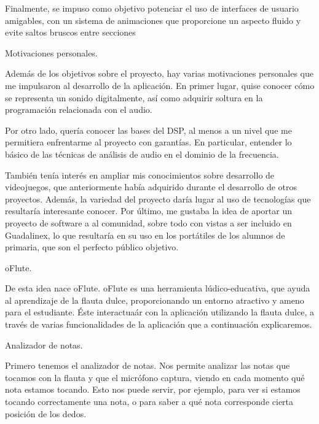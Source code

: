 \documentclass[landscape]{article}
\newenvironment{nota}
{%
\begin{framed} \noindent\itshape
}
{%
\end{framed}\vspace{-0.5cm} }
\begin{document}
\begin{multicols*}{2}
 Finalmente, se impuso como objetivo potenciar el uso de interfaces de usuario
amigables, con un sistema de animaciones que proporcione un aspecto fluido y
evite saltos bruscos entre secciones

\begin{nota}
  Motivaciones personales.
\end{nota}

Además de los objetivos sobre el proyecto, hay varias motivaciones personales
que me impulsaron al desarrollo de la aplicación. En primer lugar, quise conocer
cómo se representa un sonido digitalmente, así como adquirir soltura en la
programación relacionada con el audio.

 Por otro lado, quería conocer las bases del DSP, al menos a un
nivel que me permitiera enfrentarme al proyecto con garantías. En particular,
entender lo básico de las técnicas de análisis de audio en el dominio de la
frecuencia.

 También tenía interés en ampliar mis conocimientos sobre
desarrollo de videojuegos, que anteriormente había adquirido durante el
desarrollo de otros proyectos. Además, la variedad del proyecto daría lugar al
uso de tecnologías que resultaría interesante conocer. Por último, me gustaba la
idea de aportar un proyecto de software a al comunidad, sobre todo con vistas a
ser incluido en Guadalinex, lo que resultaría en su uso en los portátiles de los
alumnos de primaria, que son el perfecto público objetivo.

\begin{nota}
  oFlute.
\end{nota}

De esta idea nace oFlute. oFlute es una herramienta lúdico-educativa, que ayuda
al aprendizaje de la flauta dulce, proporcionando un entorno atractivo y ameno
para el estudiante. Éste interactuaár con la aplicación utilizando la flauta
dulce, a través de varias funcionalidades de la aplicación que a continuación
explicaremos.

\begin{nota}
  Analizador de notas.
\end{nota}

Primero tenemos el analizador de notas. Nos permite analizar las notas que
tocamos con la flauta y que el micrófono captura, viendo en cada momento qué
nota estamos tocando. Esto nos puede servir, por ejemplo, para ver si estamos
tocando correctamente una nota, o para saber a qué nota corresponde cierta
posición de los dedos.


\end{multicols*}
\end{document}
